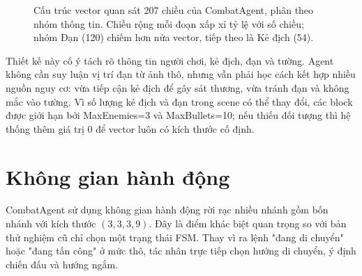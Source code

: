 \begin{figure}[H]
\centering
{}
\caption{Cấu trúc vector quan sát 207 chiều của CombatAgent, phân theo nhóm thông tin. Chiều rộng mỗi đoạn xấp xỉ tỷ lệ với số chiều; nhóm Đạn (120) chiếm hơn nửa vector, tiếp theo là Kẻ địch (54).}
\label{fig:obs_breakdown}
\end{figure}

Thiết kế này cố ý tách rõ thông tin người chơi, kẻ địch, đạn và tường. Agent không cần suy luận vị trí đạn từ ảnh thô, nhưng vẫn phải học cách kết hợp nhiều nguồn nguy cơ: vừa tiếp cận kẻ địch để gây sát thương, vừa tránh đạn và không mắc vào tường. Vì số lượng kẻ địch và đạn trong scene có thể thay đổi, các block được giới hạn bởi MaxEnemies=3 và MaxBullets=10; nếu thiếu đối tượng thì hệ thống thêm giá trị 0 để vector luôn có kích thước cố định.

\section{Không gian hành động}

CombatAgent sử dụng không gian hành động rời rạc nhiều nhánh gồm bốn nhánh với kích thước $(3,3,3,9)$. Đây là điểm khác biệt quan trọng so với bản thử nghiệm cũ chỉ chọn một trạng thái FSM. Thay vì ra lệnh "đang di chuyển" hoặc "đang tấn công" ở mức thô, tác nhân trực tiếp chọn hướng di chuyển, ý định chiến đấu và hướng ngắm.

